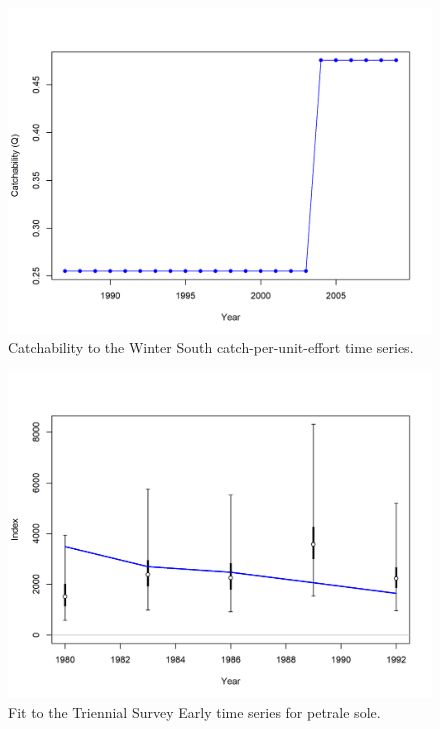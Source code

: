 \documentclass[12pt,]{article}
\begin{document}
\FloatBarrier

\begin{figure}
\centering
\includegraphics{r4ss/plots_mod1/index7_timevaryingQ_Winter (S).png}
\caption{Catchability to the Winter South catch-per-unit-effort time
series. \label{fig:q_south}}
\end{figure}

\FloatBarrier

\begin{figure}
\centering
\includegraphics{r4ss/plots_mod1/index2_cpuefit_Triennial - Early.png}
\caption{Fit to the Triennial Survey Early time series for petrale sole.
\label{fig:fit_tri_early}}
\end{figure}
\end{document}
